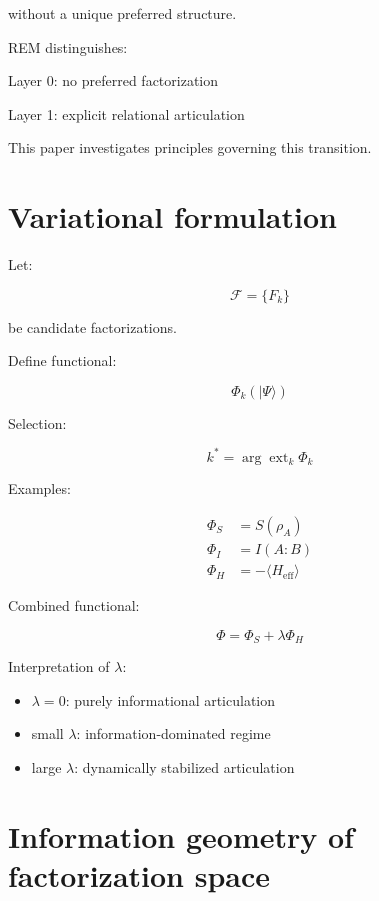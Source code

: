 \documentclass[11pt]{article}
\begin{document}
without a unique preferred structure.

REM distinguishes:

Layer 0:
no preferred factorization

Layer 1:
explicit relational articulation

This paper investigates principles governing this transition.

\section{Variational formulation}

Let:

\begin{equation}
\mathcal{F} = \{F_k\}
\end{equation}

be candidate factorizations.

Define functional:

\begin{equation}
\Phi_k(|\Psi\rangle)
\end{equation}

Selection:

\begin{equation}
k^* =
\arg\operatorname{ext}_k
\Phi_k
\end{equation}

Examples:

\begin{align}
\Phi_S &= S(\rho_A) \\
\Phi_I &= I(A:B) \\
\Phi_H &= -\langle H_{\mathrm{eff}} \rangle
\end{align}

Combined functional:

\begin{equation}
\Phi = \Phi_S + \lambda \Phi_H
\end{equation}

Interpretation of $\lambda$:

\begin{itemize}
\item $\lambda=0$: purely informational articulation
\item small $\lambda$: information-dominated regime
\item large $\lambda$: dynamically stabilized articulation
\end{itemize}

\section{Information geometry of factorization space}
\end{document}

